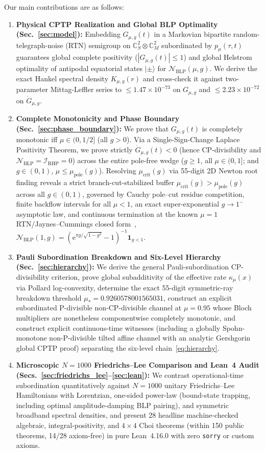 \documentclass[twocolumn,10pt,amsmath,amssymb,floatfix]{revtex4-2}
\theoremstyle{plain}
\theoremstyle{definition}
\newcommand{\ee}{\mathrm{e}}
\newcommand{\NBLP}{\mathcal{N}_{\mathrm{BLP}}}
\newcommand{\IRHP}{\mathcal{I}_{\mathrm{RHP}}}
\newcommand{\mupole}{\mu_{\mathrm{pole}}}
\newcommand{\mucrit}{\mu_{\mathrm{crit}}}
\newcommand{\mustar}{\mu_*}
\begin{document}
Our main contributions are as follows:
\begin{enumerate}[leftmargin=1.4em,itemsep=2pt]
\item \textbf{Physical CPTP Realization and Global BLP Optimality (Sec.~\ref{sec:model}):} Embedding $G_{\mu,g}(t)$ in a Markovian bipartite random-telegraph-noise (RTN) semigroup on $\mathbb{C}^2_S\otimes\mathbb{C}^2_M$ subordinated by $p_\mu(\tau,t)$ guarantees global complete positivity ($|G_{\mu,g}(t)|\le 1$) and global Helstrom optimality of antipodal equatorial states $|\pm\rangle$ for $\NBLP(\mu,g)$. We derive the exact Hankel spectral density $K_{\mu,g}(r)$ and cross-check it against two-parameter Mittag-Leffler series to $\le 1.47 \times 10^{-73}$ on $G_{\mu,g}$ and $\le 2.23 \times 10^{-72}$ on $\dot{G}_{\mu,g}$.
\item \textbf{Complete Monotonicity and Phase Boundary (Sec.~\ref{sec:phase_boundary}):} We prove that $G_{\mu,g}(t)$ is completely monotonic iff $\mu \in (0,1/2]$ (all $g>0$). Via a Single-Sign-Change Laplace Positivity Theorem, we prove strictly $\dot{G}_{\mu,g}(t)<0$ (hence CP-divisibility and $\NBLP=\IRHP=0$) across the entire pole-free wedge ($g \ge 1$, all $\mu\in(0,1]$; and $g \in (0,1)$, $\mu \le \mupole(g)$). Resolving $\mucrit(g)$ via 55-digit 2D Newton root finding reveals a strict branch-cut-stabilized buffer $\mucrit(g) > \mupole(g)$ across all $g\in(0,1)$, governed by Cauchy pole--cut residue competition, finite backflow intervals for all $\mu<1$, an exact super-exponential $g\to 1^-$ asymptotic law, and continuous termination at the known $\mu=1$ RTN/Jaynes--Cummings closed form~\cite{Addis2014PRA}, $\NBLP(1,g) = (\ee^{\pi g/\sqrt{1-g^2}}-1)^{-1}\mathbf{1}_{g<1}$.
\item \textbf{Pauli Subordination Breakdown and Six-Level Hierarchy (Sec.~\ref{sec:hierarchy}):} We derive the general Pauli-subordination CP-divisibility criterion, prove global subadditivity of the effective rate $\kappa_\mu(x)$ via Pollard log-convexity, determine the exact 55-digit symmetric-ray breakdown threshold $\mustar = 0.9260578001565031$, construct an explicit subordinated P-divisible non-CP-divisible channel at $\mu=0.95$ whose Bloch multipliers are nonetheless componentwise completely monotonic, and construct explicit continuous-time witnesses (including a globally Spohn-monotone non-P-divisible tilted affine channel with an analytic Gershgorin global CPTP proof) separating the six-level chain~\eqref{eq:hierarchy}.
\item \textbf{Microscopic $N=1000$ Friedrichs--Lee Comparison and Lean~4 Audit (Secs.~\ref{sec:friedrichs_lee}--\ref{sec:lean}):} We contrast operational-time subordination quantitatively against $N=1000$ unitary Friedrichs--Lee Hamiltonians with Lorentzian, one-sided power-law (bound-state trapping, including optimal amplitude-damping BLP pairing), and symmetric broadband spectral densities, and present 28 headline machine-checked algebraic, integral-positivity, and $4\times 4$ Choi theorems (within 150 public theorems, 14/28 axiom-free) in pure Lean~4.16.0 with zero \texttt{sorry} or custom axioms.
\end{enumerate}
\end{document}
